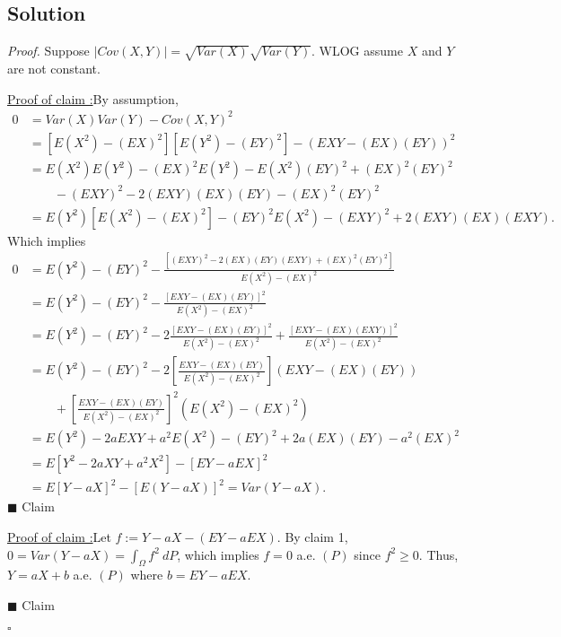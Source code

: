 \documentclass[12pt]{article}
\newcounter{ProofCounter}
\newcounter{ClaimCounter}[ProofCounter]
\newenvironment{Proof}{\stepcounter{ProofCounter}\textit{Proof.}}{\hfill$\square$}
\newenvironment{claim}[1]{\vspace{3mm}\stepcounter{ClaimCounter}\par\noindent\underline{\bf Claim \theClaimCounter:}\space#1}{}
\newenvironment{claimproof}[1]{\par\noindent\underline{Proof of claim \theClaimCounter:}\space#1}{\hfill $\blacksquare$ Claim \theClaimCounter}
\begin{document}
\subsection*{Solution}
\begin{Proof}
Suppose $|Cov(X,Y)| = \sqrt{Var(X)}\sqrt{Var(Y)}$. WLOG assume $X$ and $Y$ are not constant.

\begin{claimproof}
By assumption,
\begin{align*}
0 & = Var(X)Var(Y) - Cov(X,Y)^{2} \\
& = [E(X^{2}) - (EX)^{2}][E(Y^{2}) - (EY)^{2}] - (EXY - (EX)(EY))^{2} \\
& = E(X^{2})E(Y^{2}) - (EX)^{2}E(Y^{2}) - E(X^{2})(EY)^{2} + (EX)^{2}(EY)^{2} \\ 
& \qquad - (EXY)^{2} - 2(EXY)(EX)(EY) - (EX)^{2}(EY)^{2} \\
& = E(Y^{2})[E(X^{2}) - (EX)^{2}] - (EY)^{2}E(X^{2}) - (EXY)^{2}+ 2(EXY)(EX)(EXY).
\end{align*}
Which implies
\begin{align*}
0 & = E(Y^{2}) - (EY)^{2} - \frac{[(EXY)^{2} - 2(EX)(EY)(EXY) + (EX)^{2}(EY)^{2}]}{E(X^{2}) - (EX)^{2}} \\
& = E(Y^{2}) - (EY)^{2} - \frac{[EXY - (EX)(EY)]^{2}}{E(X^{2}) - (EX)^{2}} \\
& = E(Y^{2}) - (EY)^{2} - 2\frac{[EXY - (EX)(EY)]^{2}}{E(X^{2}) - (EX)^{2}} + \frac{[EXY - (EX)(EXY)]^{2}}{E(X^{2}) - (EX)^{2}} \\
& = E(Y^{2}) - (EY)^{2} - 2\left[ \frac{EXY - (EX)(EY)}{E(X^{2}) - (EX)^{2}} \right](EXY - (EX)(EY)) \\
& \qquad + \left[ \frac{EXY - (EX)(EY)}{E(X^{2}) -
(EX)^{2}} \right]^{2}(E(X^{2}) - (EX)^{2}) \\
& = E(Y^{2}) - 2aEXY + a^{2}E(X^{2}) - (EY)^{2} + 2a(EX)(EY) - a^{2}(EX)^{2} \\
& = E[Y^{2} - 2aXY + a^{2}X^{2}] - [EY - aEX]^{2} \\
& = E[Y - aX]^{2} - [E(Y - aX)]^{2} = Var(Y - aX).
\end{align*}
\end{claimproof}

\begin{claimproof}
Let $f := Y - aX - (EY - aEX)$. By claim 1, $0 = Var(Y - aX) = \int_{\Omega}f^{2}\ dP$,
which implies $f = 0$ a.e. $(P)$ since $f^{2} \geq 0$.  Thus, $Y = aX + b$ a.e. $(P)$ where $b = EY - aEX$. 

\end{claimproof}

\end{Proof}
\end{document}
